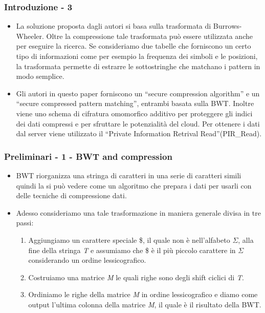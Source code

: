 \documentclass{beamer}
\begin{document}
\begin{frame}
\frametitle{Introduzione - 3}
	\begin{itemize}
		\item La soluzione proposta dagli autori si basa sulla trasformata di Burrows-Wheeler. Oltre la compressione tale trasformata può essere utilizzata anche per eseguire la ricerca. Se consideriamo due tabelle che forniscono un certo tipo di informazioni come per esempio la frequenza dei simboli e le posizioni, la trasformata permette di estrarre le sottostringhe che matchano i pattern in modo semplice.
		
		\item Gli autori in questo paper forniscono un ``secure compression algorithm'' e un “secure compressed pattern matching”, entrambi basata sulla BWT. Inoltre viene uno schema di cifratura omomorfico additivo per proteggere gli indici dei dati compressi e per sfruttare le potenzialità del cloud. Per ottenere i dati dal server viene utilizzato il ``Private Information Retrival Read''(PIR\_Read).
		
	\end{itemize}
\end{frame}
\begin{frame}
\frametitle{Preliminari - 1 - BWT and compression}
	\begin{itemize}
	 \item BWT riorganizza una stringa di caratteri in una serie di caratteri simili quindi la si può vedere come un algoritmo che prepara i dati per usarli con delle tecniche di compressione dati.
	 \item Adesso consideriamo una tale trasformazione in maniera generale divisa in tre passi:
	 \begin{enumerate}
	 	\item Aggiungiamo un carattere speciale \$, il quale non è nell'alfabeto $\Sigma$, alla fine della stringa \textit{T} e assumiamo che \$ è il più piccolo carattere in $\Sigma$ considerando un ordine lessicografico.
	 	\item Costruiamo una matrice \textit{M} le quali righe sono degli shift ciclici di \textit{T}.
	 	\item Ordiniamo le righe della matrice \textit{M} in ordine lessicografico e diamo come output l’ultima colonna della matrice \textit{M}, il quale è il risultato della BWT.	
	 \end{enumerate}
	\end{itemize}
\end{frame}
\end{document}
